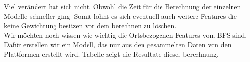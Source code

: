 %
Viel verändert hat sich nicht. Obwohl die Zeit für die Berechnung der einzelnen Modelle schneller ging. Somit lohnt es sich eventuell auch weitere Features die keine Gewichtung besitzen vor dem berechnen zu löschen.\\[2ex]
%
Wir möchten noch wissen wie wichtig die Ortsbezogenen Features vom BFS sind. Dafür erstellen wir ein Modell, das nur aus den gesammelten Daten von den Plattformen erstellt wird.
Tabelle zeigt die Resultate dieser berechnung.\\[2ex]
%
\begin{table}[ht]
\centering
{}
\caption{Ergebnisse ohne ortsbezogenen Daten vom BFS}
\label{tab:height_round}
\end{table}
%
